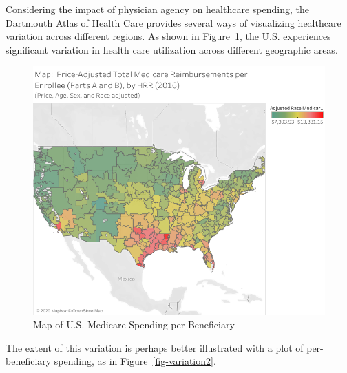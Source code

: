 \documentclass[
  letterpaper,
  DIV=11,
  numbers=noendperiod]{scrreport}
\theoremstyle{definition}
\theoremstyle{remark}
\begin{document}
Considering the impact of physician agency on healthcare spending, the
Dartmouth Atlas of Health Care provides several ways of visualizing
healthcare variation across different regions. As shown in
Figure~\ref{fig-variation1}, the U.S. experiences significant variation
in health care utilization across different geographic areas.

\begin{figure}

{\centering \includegraphics{part2/../figures/dartmouth_map.png}

}

\caption{\label{fig-variation1}Map of U.S. Medicare Spending per
Beneficiary}

\end{figure}

The extent of this variation is perhaps better illustrated with a plot
of per-beneficiary spending, as in Figure~\ref{fig-variation2}.
\end{document}
